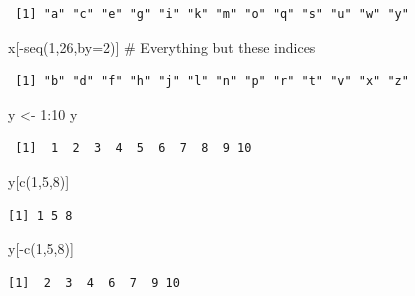 \documentclass[
  letterpaper,
  DIV=11,
  numbers=noendperiod]{scrreprt}
\newenvironment{Shaded}{\begin{snugshade}}{\end{snugshade}}
\newcommand{\AttributeTok}[1]{\textcolor[rgb]{0.40,0.45,0.13}{#1}}
\newcommand{\CommentTok}[1]{\textcolor[rgb]{0.37,0.37,0.37}{#1}}
\newcommand{\DecValTok}[1]{\textcolor[rgb]{0.68,0.00,0.00}{#1}}
\newcommand{\FunctionTok}[1]{\textcolor[rgb]{0.28,0.35,0.67}{#1}}
\newcommand{\NormalTok}[1]{\textcolor[rgb]{0.00,0.23,0.31}{#1}}
\newcommand{\OtherTok}[1]{\textcolor[rgb]{0.00,0.23,0.31}{#1}}
\newcommand{\SpecialCharTok}[1]{\textcolor[rgb]{0.37,0.37,0.37}{#1}}
\begin{document}
\begin{verbatim}
 [1] "a" "c" "e" "g" "i" "k" "m" "o" "q" "s" "u" "w" "y"
\end{verbatim}

\begin{Shaded}
\begin{Highlighting}[]
\NormalTok{x[}\SpecialCharTok{{-}}\FunctionTok{seq}\NormalTok{(}\DecValTok{1}\NormalTok{,}\DecValTok{26}\NormalTok{,}\AttributeTok{by=}\DecValTok{2}\NormalTok{)] }\CommentTok{\# Everything but these indices}
\end{Highlighting}
\end{Shaded}

\begin{verbatim}
 [1] "b" "d" "f" "h" "j" "l" "n" "p" "r" "t" "v" "x" "z"
\end{verbatim}

\begin{Shaded}
\begin{Highlighting}[]
\NormalTok{y }\OtherTok{\textless{}{-}} \DecValTok{1}\SpecialCharTok{:}\DecValTok{10}
\NormalTok{y}
\end{Highlighting}
\end{Shaded}

\begin{verbatim}
 [1]  1  2  3  4  5  6  7  8  9 10
\end{verbatim}

\begin{Shaded}
\begin{Highlighting}[]
\NormalTok{y[}\FunctionTok{c}\NormalTok{(}\DecValTok{1}\NormalTok{,}\DecValTok{5}\NormalTok{,}\DecValTok{8}\NormalTok{)]}
\end{Highlighting}
\end{Shaded}

\begin{verbatim}
[1] 1 5 8
\end{verbatim}

\begin{Shaded}
\begin{Highlighting}[]
\NormalTok{y[}\SpecialCharTok{{-}}\FunctionTok{c}\NormalTok{(}\DecValTok{1}\NormalTok{,}\DecValTok{5}\NormalTok{,}\DecValTok{8}\NormalTok{)]}
\end{Highlighting}
\end{Shaded}

\begin{verbatim}
[1]  2  3  4  6  7  9 10
\end{verbatim}
\end{document}
